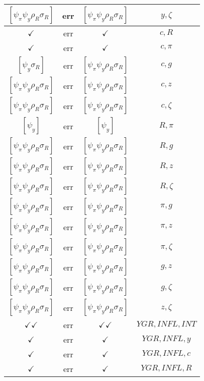 \documentclass[a4paper,10pt]{article}
\begin{document}
\begin{longtable}{|c|c|c|c|}
\hline
$[\psi_\pi \psi_y \rho_R \sigma_R ]$ & err & $[\psi_\pi \psi_y \rho_R \sigma_R ]$ & ${y},{\zeta}$ \\
\hline
$\checkmark$ & err & $\checkmark$ & ${c},{R}$ \\
\hline
$\checkmark$ & err & $\checkmark$ & ${c},{\pi}$ \\
\hline
$[\psi_y \sigma_R ]$ & err & $[\psi_\pi \psi_y \rho_R \sigma_R ]$ & ${c},{g}$ \\
\hline
$[\psi_\pi \psi_y \rho_R \sigma_R ]$ & err & $[\psi_\pi \psi_y \rho_R \sigma_R ]$ & ${c},{z}$ \\
\hline
$[\psi_\pi \psi_y \rho_R \sigma_R ]$ & err & $[\psi_\pi \psi_y \rho_R \sigma_R ]$ & ${c},{\zeta}$ \\
\hline
$[\psi_y ]$ & err & $[\psi_y ]$ & ${R},{\pi}$ \\
\hline
$[\psi_\pi \psi_y \rho_R \sigma_R ]$ & err & $[\psi_\pi \psi_y \rho_R \sigma_R ]$ & ${R},{g}$ \\
\hline
$[\psi_\pi \psi_y \rho_R \sigma_R ]$ & err & $[\psi_\pi \psi_y \rho_R \sigma_R ]$ & ${R},{z}$ \\
\hline
$[\psi_\pi \psi_y \rho_R \sigma_R ]$ & err & $[\psi_\pi \psi_y \rho_R \sigma_R ]$ & ${R},{\zeta}$ \\
\hline
$[\psi_\pi \psi_y \rho_R \sigma_R ]$ & err & $[\psi_\pi \psi_y \rho_R \sigma_R ]$ & ${\pi},{g}$ \\
\hline
$[\psi_\pi \psi_y \rho_R \sigma_R ]$ & err & $[\psi_\pi \psi_y \rho_R \sigma_R ]$ & ${\pi},{z}$ \\
\hline
$[\psi_\pi \psi_y \rho_R \sigma_R ]$ & err & $[\psi_\pi \psi_y \rho_R \sigma_R ]$ & ${\pi},{\zeta}$ \\
\hline
$[\psi_\pi \psi_y \rho_R \sigma_R ]$ & err & $[\psi_\pi \psi_y \rho_R \sigma_R ]$ & ${g},{z}$ \\
\hline
$[\psi_\pi \psi_y \rho_R \sigma_R ]$ & err & $[\psi_\pi \psi_y \rho_R \sigma_R ]$ & ${g},{\zeta}$ \\
\hline
$[\psi_\pi \psi_y \rho_R \sigma_R ]$ & err & $[\psi_\pi \psi_y \rho_R \sigma_R ]$ & ${z},{\zeta}$ \\
\hline
$\checkmark\checkmark$ & err & $\checkmark\checkmark$ & ${YGR},{INFL},{INT}$ \\
\hline
$\checkmark$ & err & $\checkmark$ & ${YGR},{INFL},{y}$ \\
\hline
$\checkmark$ & err & $\checkmark$ & ${YGR},{INFL},{c}$ \\
\hline
$\checkmark$ & err & $\checkmark$ & ${YGR},{INFL},{R}$ \\

\end{longtable}
\end{document}
